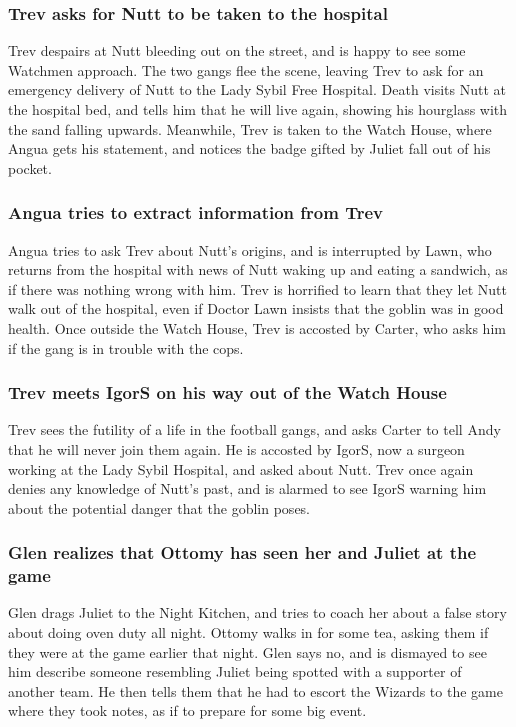 \subsubsection{\Gls{Trev} asks for \Gls{Nutt} to be taken to the hospital}
\Gls{Trev} despairs at \Gls{Nutt} bleeding out on the street, and is happy to see some Watchmen
approach. The two gangs flee the scene, leaving \Gls{Trev} to ask for an emergency delivery of
\Gls{Nutt} to the Lady Sybil Free Hospital. \Gls{Death} visits \Gls{Nutt} at the hospital bed,
and tells him that he will live again, showing his hourglass with the sand falling upwards.
Meanwhile, \Gls{Trev} is taken to the Watch House, where \Gls{Angua} gets his statement, and notices
the badge gifted by \Gls{Juliet} fall out of his pocket.

\subsubsection{\Gls{Angua} tries to extract information from \Gls{Trev}}
\Gls{Angua} tries to ask \Gls{Trev} about \Gls{Nutt}'s origins, and is interrupted by \Gls{Lawn},
who returns from the hospital with news of \Gls{Nutt} waking up and eating a sandwich, as if there
was nothing wrong with him. \Gls{Trev} is horrified to learn that they let \Gls{Nutt} walk out of
the hospital, even if Doctor \Gls{Lawn} insists that the goblin was in good health. Once outside
the Watch House, \Gls{Trev} is accosted by \Gls{Carter}, who asks him if the gang is in trouble with
the cops.

\subsubsection{\Gls{Trev} meets \Gls{IgorS} on his way out of the Watch House}
\Gls{Trev} sees the futility of a life in the football gangs, and asks \Gls{Carter} to tell
\Gls{Andy} that he will never join them again. He is accosted by \Gls{IgorS}, now a surgeon working
at the Lady Sybil Hospital, and asked about \Gls{Nutt}. \Gls{Trev} once again denies any knowledge
of \Gls{Nutt}'s past, and is alarmed to see \Gls{IgorS} warning him about the potential danger that
the goblin poses.

\subsubsection{\Gls{Glen} realizes that \Gls{Ottomy} has seen her and \Gls{Juliet} at the game}
\Gls{Glen} drags \Gls{Juliet} to the Night Kitchen, and tries to coach her about a false story about
doing oven duty all night. \Gls{Ottomy} walks in for some tea, asking them if they were at the game
earlier that night. \Gls{Glen} says no, and is dismayed to see him describe someone resembling
\Gls{Juliet} being spotted with a supporter of another team. He then tells them that he had to
escort the Wizards to the game where they took notes, as if to prepare for some big event.

